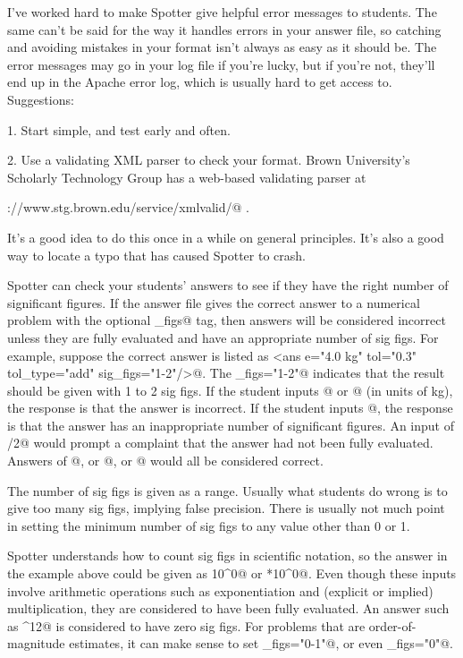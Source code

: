 \documentclass{doc}
\begin{document}
I've worked hard to make Spotter give helpful error messages to students. The same
can't be said for the way it handles errors in your answer file, so 
catching and avoiding mistakes in your format isn't always as easy as it should be.
The error messages
may go in your log file if you're lucky, but if you're not, they'll end up in the
Apache error log, which is usually hard to get access to. Suggestions:

1. Start simple, and test early and often.

2. Use a validating XML parser to check your format. Brown University's
Scholarly Technology Group has a web-based validating parser at

\noindent\verb@http://www.stg.brown.edu/service/xmlvalid/@ \qquad .

It's a good idea to do this once in a while on general principles. It's
also a good way to locate a typo that has caused Spotter to crash.

Spotter can check your students' answers to see if they have the right number of significant figures.
If the answer file gives the correct answer to a numerical problem with the optional
\verb@sig_figs@ tag, then answers will be considered incorrect unless they
are fully evaluated and have an appropriate number of sig figs. For example, suppose
the correct answer is listed as
\verb@<ans e="4.0 kg" tol="0.3" tol_type="add" sig_figs="1-2"/>@. The \verb@sig_figs="1-2"@
indicates that the result should be given with 1 to 2 sig figs.
If the student inputs @ or @ (in units of kg), the response is that the answer is incorrect.
If the student inputs @, the response is that the answer has an inappropriate number
of significant figures.
An input of /2@ would prompt a complaint that the answer had not been fully evaluated.
Answers of @, or @, or @ would all be considered correct.

The number of sig figs is given as a range. Usually what students do wrong is to give too many
sig figs, implying false precision. There is usually not much point in setting the minimum number
of sig figs to any value other than 0 or 1.

Spotter understands how to count sig figs in scientific notation, so
the answer in the example above could be given as  10^0@ or *10^0@.
Even though these inputs involve arithmetic operations such as exponentiation and
(explicit or implied) multiplication, they are considered to have been fully evaluated.
An answer such as ^12@ is considered to have zero sig figs.
For problems that are order-of-magnitude estimates, it can make sense to set \verb@sig_figs="0-1"@,
or even \verb@sig_figs="0"@.
\end{document}

